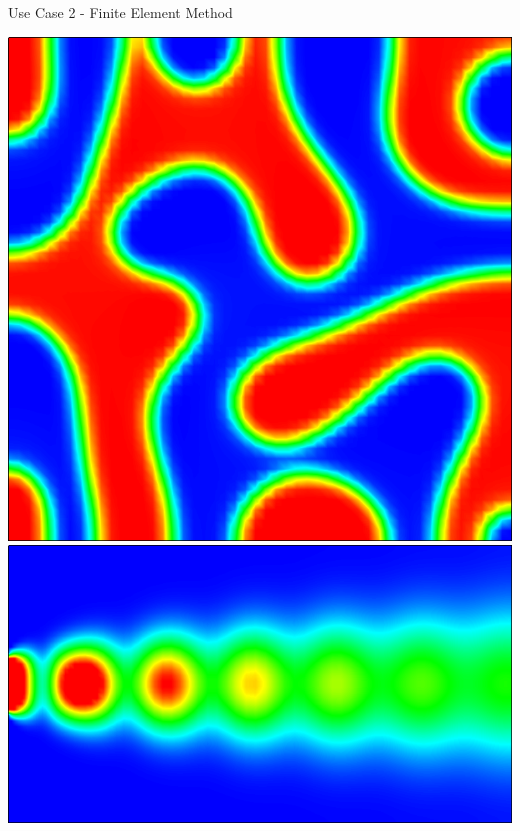 \documentclass[compress,newPxFont,sthlmFooter]{beamer}
\begin{document}
\begin{frame}[plain]{Use Case 2 - Finite Element Method}
\begin{itemize}
{      }
    \end{itemize}
    \begin{center}
        \includegraphics[align=c, height=0.30\textheight]{cahn-hilliard.png}
        \;
        \includegraphics[align=c, height=0.30\textheight]{heat_convection.png}
        \;

\end{center}
\end{frame}
\end{document}
